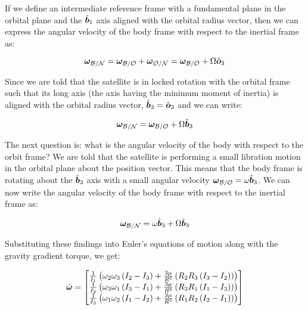 If we define an intermediate reference frame with a fundamental plane in the orbital plane and the $\hat{\boldsymbol{b}}_1$ axis aligned with the orbital radius vector, then we can express the angular velocity of the body frame with respect to the inertial frame as:

\begin{equation}
    \boldsymbol{\omega}_\mathcal{B/N} = \boldsymbol{\omega}_\mathcal{B/O} + \boldsymbol{\omega}_\mathcal{O/N} =\boldsymbol{\omega}_\mathcal{B/O} + \Omega \hat{\boldsymbol{o}}_3
\end{equation}

Since we are told that the satellite is in locked rotation with the orbital frame such that its long axis (the axis having the minimum moment of inertia) is aligned with the orbital radius vector, $\hat{\boldsymbol{b}}_3 = \hat{\boldsymbol{o}}_3$ and we can write:

\begin{equation}
    \boldsymbol{\omega}_\mathcal{B/N} = \boldsymbol{\omega}_\mathcal{B/O} + \Omega \hat{\boldsymbol{b}}_3
\end{equation}

The next question is: what is the angular velocity of the body with respect to the orbit frame? We are told that the satellite is performing a small libration motion in the orbital plane about the position vector. This means that the body frame is rotating about the $\hat{\boldsymbol{b}}_3$ axis with a small angular velocity $\boldsymbol{\omega}_\mathcal{B/O} = \omega \hat{\boldsymbol{b}}_3$. We can now write the angular velocity of the body frame with respect to the inertial frame as:

\begin{equation}
    \boldsymbol{\omega}_\mathcal{B/N} = \omega \hat{\boldsymbol{b}}_3 + \Omega \hat{\boldsymbol{b}}_3
\end{equation}

Substituting these findings into Euler's equations of motion along with the gravity gradient torque, we get:

\begin{align*}
    \dot{\boldsymbol{\omega}} &= \begin{bmatrix}
        \frac{1}{I_1} \left(\omega_2 \omega_3 \left(I_2 - I_3\right) + \frac{3 \mu}{R^5} \left(R_2 R_3 \left(I_3 - I_2\right)\right)\right) \\
        \frac{1}{I_2} \left(\omega_3 \omega_1 \left(I_3 - I_1\right) + \frac{3 \mu}{R^5} \left(R_3 R_1 \left(I_1 - I_3\right)\right)\right) \\
        \frac{1}{I_3} \left(\omega_1 \omega_2 \left(I_1 - I_2\right) + \frac{3 \mu}{R^5} \left(R_1 R_2 \left(I_2 - I_1\right)\right)\right) \\
    \end{bmatrix} \\
\end{align*}

